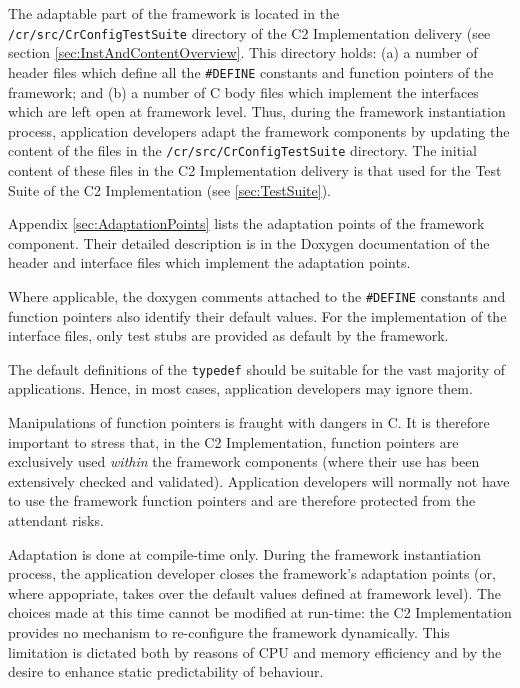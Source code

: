 \documentclass[a4paper,10pt]{article}
\begin{document}
The adaptable part of the framework is located in the \texttt{/cr/src/CrConfigTestSuite} directory of the C2 Implementation delivery (see section \ref{sec:InstAndContentOverview}. This directory holds: (a) a number of header files which define all the \texttt{\#DEFINE} constants and function pointers of the framework; and (b) a number of C body files which implement the interfaces which are left open at framework level. Thus, during the framework instantiation process, application developers adapt the framework components by updating the content of the files in the \texttt{/cr/src/CrConfigTestSuite} directory. The initial content of these files in the C2 Implementation delivery is that used for the Test Suite of the C2 Implementation (see \ref{sec:TestSuite}). 

Appendix \ref{sec:AdaptationPoints} lists the adaptation points of the framework component. Their detailed description is in the Doxygen documentation of the header and interface files which implement the adaptation points. 

Where applicable, the doxygen comments attached to the \texttt{\#DEFINE} constants and function pointers also identify their default values. For the implementation of the interface files, only test stubs are provided as default by the framework.

The default definitions of the \texttt{typedef} should be suitable for the vast majority of applications. Hence, in most cases, application developers may ignore them.

Manipulations of function pointers is fraught with dangers in C. It is therefore important to stress that, in the C2 Implementation, function pointers are exclusively used \textit{within} the framework components (where their use has been extensively checked and validated). Application developers will normally not have to use the framework function pointers and are therefore protected from the attendant risks.

Adaptation is done at compile-time only. During the framework instantiation process, the application developer closes the framework's adaptation points (or, where appopriate, takes over the default values defined at framework level). The choices made at this time cannot be modified at run-time: the C2 Implementation provides no mechanism to re-configure the framework dynamically. This limitation is dictated both by reasons of CPU and memory efficiency and by the desire to enhance static predictability of behaviour.

\end{document}
